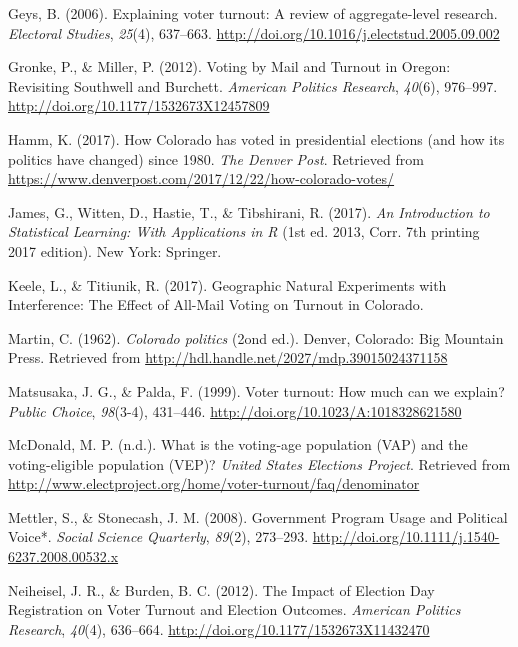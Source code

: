 \documentclass[12pt,twoside]{reedthesis}
\begin{document}
  \hypertarget{ref-geys_explaining_2006}{}
  Geys, B. (2006). Explaining voter turnout: A review of aggregate-level
  research. \emph{Electoral Studies}, \emph{25}(4), 637--663.
  \url{http://doi.org/10.1016/j.electstud.2005.09.002}
  
  \hypertarget{ref-gronke_voting_2012}{}
  Gronke, P., \& Miller, P. (2012). Voting by Mail and Turnout in Oregon:
  Revisiting Southwell and Burchett. \emph{American Politics Research},
  \emph{40}(6), 976--997. \url{http://doi.org/10.1177/1532673X12457809}
  
  \hypertarget{ref-hamm_how_2017}{}
  Hamm, K. (2017). How Colorado has voted in presidential elections (and
  how its politics have changed) since 1980. \emph{The Denver Post}.
  Retrieved from
  \url{https://www.denverpost.com/2017/12/22/how-colorado-votes/}
  
  \hypertarget{ref-james_introduction_2017}{}
  James, G., Witten, D., Hastie, T., \& Tibshirani, R. (2017). \emph{An
  Introduction to Statistical Learning: With Applications in R} (1st ed.
  2013, Corr. 7th printing 2017 edition). New York: Springer.
  
  \hypertarget{ref-keele_geographic_2017}{}
  Keele, L., \& Titiunik, R. (2017). Geographic Natural Experiments with
  Interference: The Effect of All-Mail Voting on Turnout in Colorado.
  
  \hypertarget{ref-martin_colorado_1962}{}
  Martin, C. (1962). \emph{Colorado politics} (2ond ed.). Denver,
  Colorado: Big Mountain Press. Retrieved from
  \url{http://hdl.handle.net/2027/mdp.39015024371158}
  
  \hypertarget{ref-matsusaka_voter_1999}{}
  Matsusaka, J. G., \& Palda, F. (1999). Voter turnout: How much can we
  explain? \emph{Public Choice}, \emph{98}(3-4), 431--446.
  \url{http://doi.org/10.1023/A:1018328621580}
  
  \hypertarget{ref-mcdonald_what_nodate}{}
  McDonald, M. P. (n.d.). What is the voting-age population (VAP) and the
  voting-eligible population (VEP)? \emph{United States Elections
  Project}. Retrieved from
  \url{http://www.electproject.org/home/voter-turnout/faq/denominator}
  
  \hypertarget{ref-mettler_government_2008}{}
  Mettler, S., \& Stonecash, J. M. (2008). Government Program Usage and
  Political Voice*. \emph{Social Science Quarterly}, \emph{89}(2),
  273--293. \url{http://doi.org/10.1111/j.1540-6237.2008.00532.x}
  
  \hypertarget{ref-neiheisel_impact_2012}{}
  Neiheisel, J. R., \& Burden, B. C. (2012). The Impact of Election Day
  Registration on Voter Turnout and Election Outcomes. \emph{American
  Politics Research}, \emph{40}(4), 636--664.
  \url{http://doi.org/10.1177/1532673X11432470}
  
\end{document}
